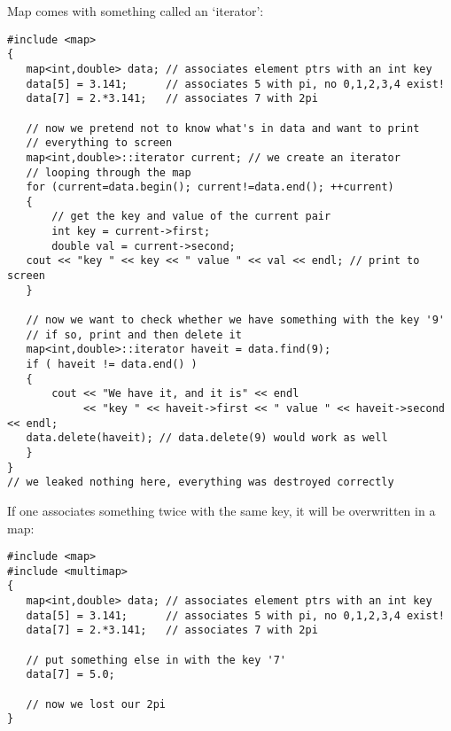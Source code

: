 Map comes with something called an `iterator':\\
\begin{boxedminipage}{\linewidth}
\begin{verbatim}
#include <map>
{
   map<int,double> data; // associates element ptrs with an int key
   data[5] = 3.141;      // associates 5 with pi, no 0,1,2,3,4 exist!
   data[7] = 2.*3.141;   // associates 7 with 2pi

   // now we pretend not to know what's in data and want to print
   // everything to screen
   map<int,double>::iterator current; // we create an iterator
   // looping through the map
   for (current=data.begin(); current!=data.end(); ++current)
   {
       // get the key and value of the current pair
       int key = current->first;
       double val = current->second;
   cout << "key " << key << " value " << val << endl; // print to screen
   }

   // now we want to check whether we have something with the key '9'
   // if so, print and then delete it
   map<int,double>::iterator haveit = data.find(9);
   if ( haveit != data.end() )
   {
       cout << "We have it, and it is" << endl
            << "key " << haveit->first << " value " << haveit->second << endl;
   data.delete(haveit); // data.delete(9) would work as well
   }
}
// we leaked nothing here, everything was destroyed correctly
\end{verbatim}
\end{boxedminipage}

If one associates something twice with the same key, it will be overwritten in a map:\\
\begin{boxedminipage}{\linewidth}
\begin{verbatim}
#include <map>
#include <multimap>
{
   map<int,double> data; // associates element ptrs with an int key
   data[5] = 3.141;      // associates 5 with pi, no 0,1,2,3,4 exist!
   data[7] = 2.*3.141;   // associates 7 with 2pi

   // put something else in with the key '7'
   data[7] = 5.0;

   // now we lost our 2pi
}
\end{verbatim}
\end{boxedminipage}

